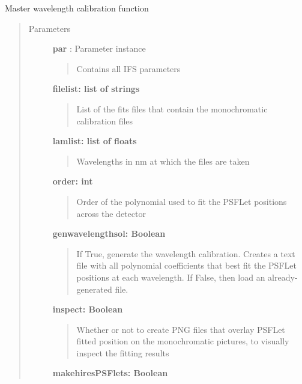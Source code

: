\documentclass[letterpaper,10pt,english]{sphinxmanual}
\begin{document}
\begin{fulllineitems}
\label{tools:tools.wavecal.buildcalibrations}
Master wavelength calibration function
\begin{quote}\begin{description}
\item[{Parameters}] \leavevmode
\textbf{par} :   Parameter instance
\begin{quote}

Contains all IFS parameters
\end{quote}

\textbf{filelist: list of strings}
\begin{quote}

List of the fits files that contain the monochromatic calibration files
\end{quote}

\textbf{lamlist: list of floats}
\begin{quote}

Wavelengths in nm at which the files are taken
\end{quote}

\textbf{order: int}
\begin{quote}

Order of the polynomial used to fit the PSFLet positions across the detector
\end{quote}

\textbf{genwavelengthsol: Boolean}
\begin{quote}

If True, generate the wavelength calibration. Creates a text file with all
polynomial coefficients that best fit the PSFLet positions at each wavelength.
If False, then load an already-generated file.
\end{quote}

\textbf{inspect: Boolean}
\begin{quote}

Whether or not to create PNG files that overlay PSFLet fitted position on the
monochromatic pictures, to visually inspect the fitting results
\end{quote}

\textbf{makehiresPSFlets: Boolean}
\begin{quote}


\end{quote}
\end{description}
\end{quote}
\end{fulllineitems}
\end{document}
